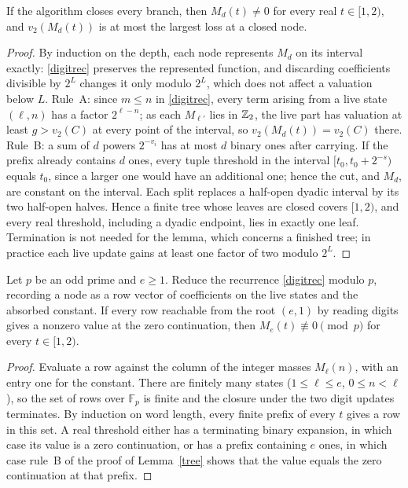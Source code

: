 \documentclass[11pt]{article}
\begin{document}
\begin{lemma}\label{tree}
If the algorithm closes every branch, then \(M_d(t)\ne0\) for every real
\(t\in[1,2)\), and \(v_2(M_d(t))\) is at most the largest loss at a closed
node. 
\end{lemma}
\begin{proof}
By induction on the depth, each node represents \(M_d\) on its interval
exactly: \eqref{digitrec} preserves the represented function, and
discarding coefficients divisible by \(2^L\) changes it only modulo
\(2^L\), which does not affect a valuation below \(L\). Rule~A: since
\(m\le n\) in \eqref{digitrec}, every term arising from a live state
\((\ell,n)\) has a factor \(2^{\ell-n}\); as each \(M_{\ell'}\) lies in
\(\mathbb Z_2\), the live part has valuation at least \(g>v_2(C)\) at every point
of the interval, so \(v_2(M_d(t))=v_2(C)\) there. Rule~B: a sum of \(d\)
powers \(2^{-v_i}\) has at most \(d\) binary ones after carrying. If the
prefix already contains \(d\) ones, every tuple threshold in the interval
\([t_0,t_0+2^{-s})\) equals \(t_0\), since a larger one would have an
additional one; hence the cut, and \(M_d\), are constant on the interval.
Each split replaces a half-open dyadic interval by its two half-open
halves. Hence a finite tree whose leaves are closed covers \([1,2)\), and
every real threshold, including a dyadic endpoint, lies in exactly one
leaf. Termination is not needed for the lemma, which concerns a finished
tree; in practice each live update gains at least one factor of two
modulo \(2^L\).
\end{proof}

\begin{lemma}\label{words}
Let \(p\) be an odd prime and \(e\ge1\). Reduce the recurrence
\eqref{digitrec} modulo \(p\), recording a node as a row vector of
coefficients on the live states and the absorbed constant. If every row
reachable from the root \((e,1)\) by reading digits gives a nonzero value at
the zero continuation, then \(M_e(t)\not\equiv0\pmod p\) for every
\(t\in[1,2)\). 
\end{lemma}
\begin{proof}
Evaluate a row against the column of the integer masses \(M_\ell(n)\),
with an entry one for the constant. There are finitely many states
(\(1\le\ell\le e\), \(0\le n<\ell\)), so the set of rows over
\(\mathbb F_p\) is finite and the closure under the two digit updates
terminates. By induction on word length, every finite prefix of every
\(t\) gives a row in this set. A real threshold either has a terminating
binary expansion, in which case its value is a zero continuation, or has
a prefix containing \(e\) ones, in which case rule~B of the proof of
Lemma~\ref{tree} shows that the value equals the zero continuation at
that prefix.
\end{proof}
\end{document}
